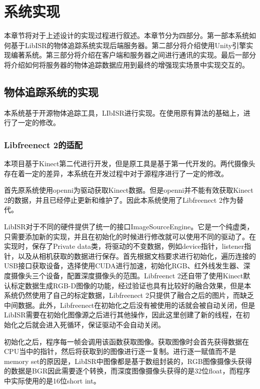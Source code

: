 \chapter{系统实现}
\label{implement}

本章节将对于上述设计的实现过程进行叙述。本章节分为四部分。第一部本系统如何基于LibISR的物体追踪系统\cite{Ren_3DV_2014, star3d_iccv_2013}实现后端服务器。第二部分将介绍使用Unity引擎实现编著系统。第三部分将介绍在客户端和服务器之间进行通讯的实现。最后一部分将介绍如何将服务器的物体追踪数据应用到最终的增强现实场景中实现交互的。

\section{物体追踪系统的实现}
本系统基于开源物体追踪工具，LIbISR进行实现。在使用原有算法的基础上，进行了一定的修改。

\subsection{Libfreenect 2的适配}
本项目基于Kinect第二代进行开发，但是原工具是基于第一代开发的。两代摄像头存在着一定的差异，本系统在开发过程中对于源程序进行了一定的修改。

首先原系统使用openni为驱动获取Kinect数据。但是openni并不能有效获取Kinect 2的数据，并且已经停止更新和维护了。因此本系统使用了Libfreenect 2作为替代。

LibISR对于不同的硬件提供了统一的接口ImageSourceEngine。它是一个纯虚类，只需要添加新的实现，并且在初始化的时候进行修改就可以使用不同的驱动了。在实现时，保存了Private data类，将驱动的不变数据，例如device指针，listener指针，以及从相机获取的数据进行保存。首先根据文档要求进行初始化，遍历连接的USB接口获取设备，选择使用CUDA进行加速，初始化RGB、红外线发生器、深度摄像头三个设备，配置深度摄像头的范围。Libfreenct 2还自带了使用Kinect默认标定数据生成RGB-D图像的功能，经过验证也具有比较好的融合效果，但是本系统仍然使用了自己的标定数据，Libfreenect 2只提供了融合之后的图片，而缺乏中间数据。此外，Libfreenect在初始化之后没有被使用的话就会被自动关闭，但是LibISR需要在初始化图像源之后进行其他操作，因此这里创建了新的线程，在初始化之后就会进入死循环，保证驱动不会自动关闭。

初始化之后，程序每一帧会调用该函数获取图像。获取图像时会首先获得数据在CPU当中的指针，然后将获取到的图像进行逐一复制。进行逐一赋值而不是memory set的原因是，LibISR中图像都是基于数组封装的，RGB图像摄像头获得的数据是BGR因此需要逐个转换，而深度图像摄像头获得的是32位float，而程序中实际使用的是16位short int。

